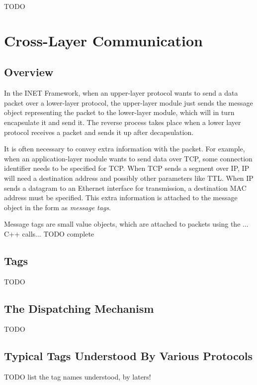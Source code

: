 \ifdraft TODO

\chapter{Cross-Layer Communication}
\label{cha:cross-layer-communication}

\section{Overview}

In the INET Framework, when an upper-layer protocol wants to send a data
packet over a lower-layer protocol, the upper-layer module just sends the
message object representing the packet to the lower-layer module, which
will in turn encapsulate it and send it. The reverse process takes place
when a lower layer protocol receives a packet and sends it up after
decapsulation.

It is often necessary to convey extra information with the packet. For
example, when an application-layer module wants to send data over TCP, some
connection identifier needs to be specified for TCP. When TCP sends a
segment over IP, IP will need a destination address and possibly other
parameters like TTL. When IP sends a datagram to an Ethernet interface for
transmission, a destination MAC address must be specified. This extra
information is attached to the message object in the form as \textit{message tags}.

Message tags are small value objects, which are attached to packets using 
the ... C++ calls...  TODO complete

 

\section{Tags}

TODO

\section{The Dispatching Mechanism}

TODO

\section{Typical Tags Understood By Various Protocols}

TODO list the tag names understood, by laters!

\fi



